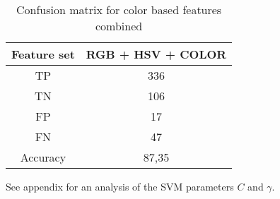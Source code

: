 \FloatBarrier
\begin{table}[h!]
	\begin{center}
		\caption{Confusion matrix for color based features combined}
		\begin{tabular}{|c|c|}
			\hline
			Feature set & RGB + HSV + COLOR \\ \hline
			    TP      &    336    \\ \hline
			    TN      &    106     \\ \hline
			    FP      &    17     \\ \hline
			    FN      &    47     \\ \hline
			 Accuracy   &   87,35   \\ \hline
		\end{tabular}
		
		\label{table:color_features}
	\end{center}
\end{table}
\FloatBarrier

See appendix for an analysis of the SVM parameters $C$ and $\gamma$.





